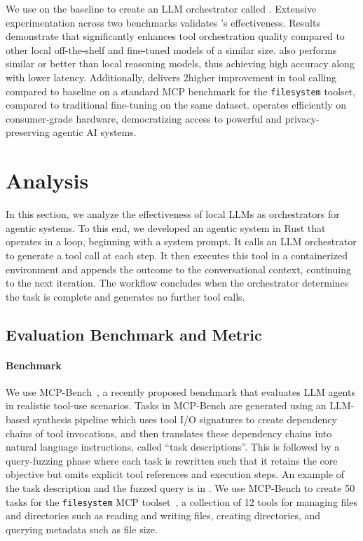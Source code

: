 We use \decoupled{} on the baseline \baselinemodel{} to create an LLM orchestrator called \sysmodel{}. Extensive experimentation across two benchmarks validates \sys{}'s effectiveness. Results demonstrate that \sysmodel{} significantly enhances tool orchestration quality compared to other local off-the-shelf and fine-tuned models of a similar size. \sys{} also performs similar or better than local reasoning models, thus achieving high accuracy along with lower latency. Additionally, \decoupled{} delivers 2\myx higher improvement in tool calling compared to baseline on a standard MCP benchmark for the \texttt{filesystem} toolset, compared to traditional fine-tuning on the same dataset. \sys{} operates efficiently on consumer-grade hardware, democratizing access to powerful and privacy-preserving agentic AI systems.

\section{Analysis}

In this section, we analyze the effectiveness of local LLMs as orchestrators for agentic systems. To this end, we developed an agentic system in Rust that operates in a loop, beginning with a system prompt. It calls an LLM orchestrator to generate a tool call at each step. It then executes this tool in a containerized environment 
and appends the outcome to the conversational context, continuing to the next iteration. The workflow concludes when the orchestrator determines the task is complete and generates no further tool calls.

\subsection{Evaluation Benchmark and Metric}
\label{analysis:benchmark_metric}


\paragraph{Benchmark}
We use MCP-Bench~\cite{wang2025mcp}, a recently proposed benchmark that evaluates LLM
agents in realistic tool-use scenarios. Tasks in MCP-Bench are generated using an LLM-based synthesis pipeline which uses tool I/O signatures to create dependency chains of tool invocations, and then translates these dependency chains into natural language instructions, called ``task descriptions''. This is followed by a query-fuzzing phase where each task is rewritten such that it retains the core objective but omits explicit tool references and execution steps. An example of the task description and the fuzzed query is in . We use MCP-Bench to create 50 tasks for the \texttt{filesystem} MCP toolset~\cite{mcp_filesystem_server}, a collection of 12 tools for managing files and directories such as reading and writing files, creating directories, and querying metadata such as file size.


